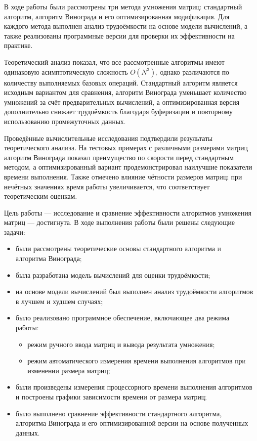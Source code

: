 
В ходе работы были рассмотрены три метода умножения матриц: стандартный алгоритм, алгоритм Винограда и его оптимизированная модификация. 
Для каждого метода выполнен анализ трудоёмкости на основе модели вычислений, а также реализованы программные версии для проверки их эффективности на практике.

Теоретический анализ показал, что все рассмотренные алгоритмы имеют одинаковую асимптотическую сложность $O(N^3)$, однако различаются по количеству выполняемых базовых операций. Стандартный алгоритм является исходным вариантом для сравнения, алгоритм Винограда уменьшает количество умножений за счёт предварительных вычислений, а оптимизированная версия дополнительно снижает трудоёмкость благодаря буферизации и повторному использованию промежуточных данных.

Проведённые вычислительные исследования подтвердили результаты теоретического анализа. На тестовых примерах с различными размерами матриц алгоритм Винограда показал преимущество по скорости перед стандартным методом, а оптимизированный вариант продемонстрировал наилучшие показатели времени выполнения. Также отмечено влияние чётности размеров матриц: при нечётных значениях время работы увеличивается, что соответствует теоретическим оценкам.

Цель работы — исследование и сравнение эффективности алгоритмов умножения матриц — достигнута. 
В ходе выполнения работы были решены следующие задачи:

\begin{itemize}
	\item были рассмотрены теоретические основы стандартного алгоритма и алгоритма Винограда;
	\item была разработана модель вычислений для оценки трудоёмкости;
	\item на основе модели вычислений был выполнен анализ трудоёмкости алгоритмов в лучшем и худшем случаях;
	\item было реализовано программное обеспечение, включающее два режима работы:
	\begin{itemize}
		\item режим ручного ввода матриц и вывода результата умножения;
		\item режим автоматического измерения времени выполнения алгоритмов при изменении размера матриц;
	\end{itemize}
	\item были произведены измерения процессорного времени выполнения алгоритмов и построены графики зависимости времени от размера матриц;
	\item было выполнено сравнение эффективности стандартного алгоритма, алгоритма Винограда и его оптимизированной версии на основе полученных данных.
\end{itemize}

\clearpage
